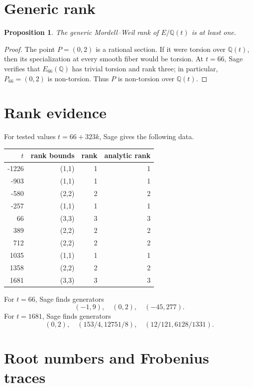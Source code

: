 \documentclass[11pt]{article}
\newtheorem{proposition}{Proposition}
\newcommand{\Q}{\mathbb{Q}}
\begin{document}
\section{Generic rank}

\begin{proposition}
The generic Mordell--Weil rank of \(E/\Q(t)\) is at least one.
\end{proposition}

\begin{proof}
The point \(P=(0,2)\) is a rational section. If it were torsion over
\(\Q(t)\), then its specialization at every smooth fiber would be torsion.
At \(t=66\), Sage verifies that \(E_{66}(\Q)\) has trivial torsion and rank
three; in particular, \(P_{66}=(0,2)\) is non-torsion. Thus \(P\) is
non-torsion over \(\Q(t)\).
\end{proof}

\section{Rank evidence}

For tested values \(t=66+323k\), Sage gives the following data.

\begin{center}
\begin{tabular}{rrrr}
\toprule
\(t\) & rank bounds & rank & analytic rank\\
\midrule
-1226 & (1,1) & 1 & 1\\
-903  & (1,1) & 1 & 1\\
-580  & (2,2) & 2 & 2\\
-257  & (1,1) & 1 & 1\\
66    & (3,3) & 3 & 3\\
389   & (2,2) & 2 & 2\\
712   & (2,2) & 2 & 2\\
1035  & (1,1) & 1 & 1\\
1358  & (2,2) & 2 & 2\\
1681  & (3,3) & 3 & 3\\
\bottomrule
\end{tabular}
\end{center}

For \(t=66\), Sage finds generators
\[
(-1,9),\quad (0,2),\quad (-45,277).
\]
For \(t=1681\), Sage finds generators
\[
(0,2),\quad (153/4,12751/8),\quad (12/121,6128/1331).
\]

\section{Root numbers and Frobenius traces}
\end{document}
